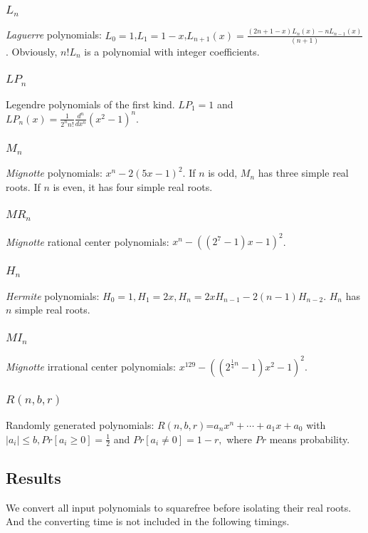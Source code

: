  \subsubsection{$L_n$}
 {\it Laguerre}  polynomials: $L_0=1$,$L_1=1-x$,$L_{n+1}(x)=\frac{  (2n+1-x )L_n(x)-  nL_{n-1 }(x)}{(n+1) }$.
Obviously, $n!L_n$ is a polynomial with integer coefficients.
 \subsubsection{$LP_n$} Legendre polynomials of the first kind. $LP_1=1$ and $LP_n(x)=\frac{1}{2^nn!}\frac{d^n}{dx^n}(x^2-1)^n$.
 \subsubsection{$M_n$} {\it Mignotte} polynomials: $x^n-2(5x-1)^2$. If $n$ is odd, $M_n$ has three simple real roots. If $n$ is even, it has four simple real roots.

\subsubsection{$MR_n$}{\it Mignotte} rational center polynomials: $ x^n-((2^7-1)x-1)^2$.
	
 \subsubsection{$H_n$}{\it Hermite } polynomials:  $H_0=1,H_1=2x,H_n=2xH_{n-1}-2(n-1)H_{n-2}$. $H_n$ has $n$ simple real roots.

 \subsubsection{$MI_n$} {\it Mignotte} irrational center polynomials: $x^{129}-((2^{\frac{1}{4}n}-1)x^2-1)^2$.


 \subsubsection{$R(n,b,r) $} Randomly generated polynomials: $R(n,b,r)$=$a_nx^n+\cdots+a_1x+a_0$ with $|a_i|\le b, Pr[a_i\ge 0]=\frac{1}{2}$ and  $Pr[a_i\neq 0] =1-r,$ where $Pr$ means probability.



 \subsection{Results}
We  convert all input polynomials to squarefree before isolating their real roots. And the converting time is not included in the following timings.

